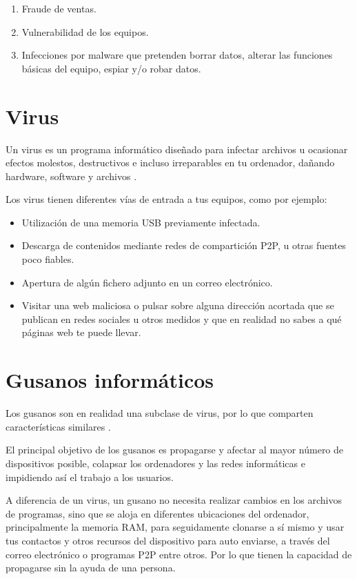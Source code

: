 \documentclass[
  a4paper,
  openany]{book}
\begin{document}
\begin{enumerate}
\def\labelenumi{\arabic{enumi}.}
\item
  Fraude de ventas.
\item
  Vulnerabilidad de los equipos.
\item
  Infecciones por malware que pretenden borrar datos, alterar las funciones básicas del equipo, espiar y/o robar datos.
\end{enumerate}

\hypertarget{virus}{%
\section{Virus}\label{virus}}

Un virus es un programa informático diseñado para infectar archivos u ocasionar efectos molestos, destructivos e incluso irreparables en tu ordenador, dañando hardware, software y archivos \citep{PANDA-virus}.

Los virus tienen diferentes vías de entrada a tus equipos, como por ejemplo:

\begin{itemize}
\item
  Utilización de una memoria USB previamente infectada.
\item
  Descarga de contenidos mediante redes de compartición P2P, u otras fuentes poco fiables.
\item
  Apertura de algún fichero adjunto en un correo electrónico.
\item
  Visitar una web maliciosa o pulsar sobre alguna dirección acortada que se publican en redes sociales u otros medidos y que en realidad no sabes a qué páginas web te puede llevar.
\end{itemize}

\hypertarget{gusanos-informuxe1ticos}{%
\section{Gusanos informáticos}\label{gusanos-informuxe1ticos}}

Los gusanos son en realidad una subclase de virus, por lo que comparten características similares \citep{PANDA-gusano}.

El principal objetivo de los gusanos es propagarse y afectar al mayor número de dispositivos posible, colapsar los ordenadores y las redes informáticas e impidiendo así el trabajo a los usuarios.

A diferencia de un virus, un gusano no necesita realizar cambios en los archivos de programas, sino que se aloja en diferentes ubicaciones del ordenador, principalmente la memoria RAM, para seguidamente clonarse a sí mismo y usar tus contactos y otros recursos del dispositivo para auto enviarse, a través del correo electrónico o programas P2P entre otros. Por lo que tienen la capacidad de propagarse sin la ayuda de una persona.
\end{document}

